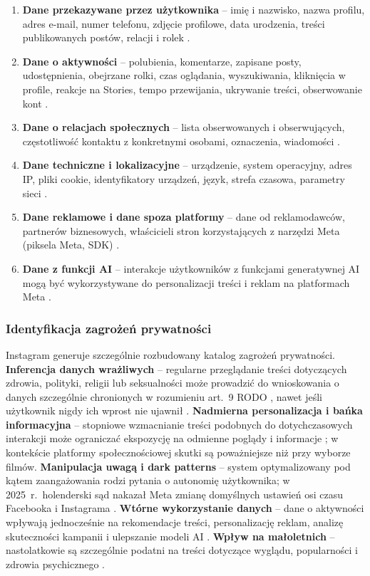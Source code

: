 \documentclass[12pt, a4paper]{article}
\begin{document}
\begin{enumerate}
  \item \textbf{Dane przekazywane przez użytkownika} -- imię i nazwisko, nazwa profilu, adres e-mail, numer telefonu, zdjęcie profilowe, data urodzenia, treści publikowanych postów, relacji i rolek \cite{meta_privacy}.
  \item \textbf{Dane o aktywności} -- polubienia, komentarze, zapisane posty, udostępnienia, obejrzane rolki, czas oglądania, wyszukiwania, kliknięcia w profile, reakcje na Stories, tempo przewijania, ukrywanie treści, obserwowanie kont \cite{meta_privacy, ig_creators}.
  \item \textbf{Dane o relacjach społecznych} -- lista obserwowanych i obserwujących, częstotliwość kontaktu z konkretnymi osobami, oznaczenia, wiadomości \cite{meta_privacy}.
  \item \textbf{Dane techniczne i lokalizacyjne} -- urządzenie, system operacyjny, adres IP, pliki cookie, identyfikatory urządzeń, język, strefa czasowa, parametry sieci \cite{meta_privacy}.
  \item \textbf{Dane reklamowe i dane spoza platformy} -- dane od reklamodawców, partnerów biznesowych, właścicieli stron korzystających z narzędzi Meta (piksela Meta, SDK) \cite{meta_privacy}.
  \item \textbf{Dane z funkcji AI} -- interakcje użytkowników z funkcjami generatywnej AI mogą być wykorzystywane do personalizacji treści i reklam na platformach Meta \cite{meta_ai}.
\end{enumerate}

\subsubsection{Identyfikacja zagrożeń prywatności}

Instagram generuje szczególnie rozbudowany katalog zagrożeń prywatności. \textbf{Inferencja danych wrażliwych} -- regularne przeglądanie treści dotyczących zdrowia, polityki, religii lub seksualności może prowadzić do wnioskowania o danych szczególnie chronionych w rozumieniu art.~9 RODO \cite{rodo}, nawet jeśli użytkownik nigdy ich wprost nie ujawnił \cite{chen2025, himeur2022}. \textbf{Nadmierna personalizacja i bańka informacyjna} -- stopniowe wzmacnianie treści podobnych do dotychczasowych interakcji może ograniczać ekspozycję na odmienne poglądy i informacje \cite{ig_ranking}; w kontekście platformy społecznościowej skutki są poważniejsze niż przy wyborze filmów. \textbf{Manipulacja uwagą i dark patterns} -- system optymalizowany pod kątem zaangażowania rodzi pytania o autonomię użytkownika; w 2025~r.\ holenderski sąd nakazał Meta zmianę domyślnych ustawień osi czasu Facebooka i Instagrama \cite{reuters_nl}. \textbf{Wtórne wykorzystanie danych} -- dane o aktywności wpływają jednocześnie na rekomendacje treści, personalizację reklam, analizę skuteczności kampanii i ulepszanie modeli AI \cite{meta_privacy, meta_ai}. \textbf{Wpływ na małoletnich} -- nastolatkowie są szczególnie podatni na treści dotyczące wyglądu, popularności i zdrowia psychicznego \cite{meta_teen}.
\end{document}
